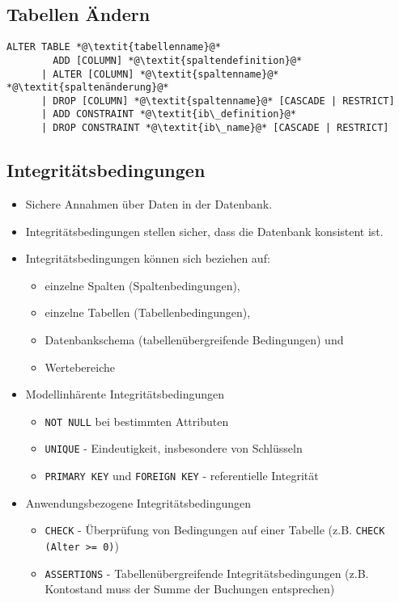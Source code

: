         \subsection{Tabellen Ändern} %
			\begin{lstlisting}
ALTER TABLE *@\textit{tabellenname}@*
		ADD [COLUMN] *@\textit{spaltendefinition}@*
	  | ALTER [COLUMN] *@\textit{spaltenname}@* *@\textit{spaltenänderung}@*
	  | DROP [COLUMN] *@\textit{spaltenname}@* [CASCADE | RESTRICT]
	  | ADD CONSTRAINT *@\textit{ib\_definition}@*
	  | DROP CONSTRAINT *@\textit{ib\_name}@* [CASCADE | RESTRICT]
			\end{lstlisting}

        \subsection{Integritätsbedingungen} %
            \begin{itemize}
            	\item Sichere Annahmen über Daten in der Datenbank.
            	\item Integritätsbedingungen stellen sicher, dass die Datenbank konsistent ist.
            	\item Integritätsbedingungen können sich beziehen auf:
            		\begin{itemize}
            			\item einzelne Spalten (Spaltenbedingungen),
            			\item einzelne Tabellen (Tabellenbedingungen),
            			\item Datenbankschema (tabellenübergreifende Bedingungen) und
            			\item Wertebereiche
            		\end{itemize}
            	\item Modellinhärente Integritätsbedingungen
            		\begin{itemize}
            			\item \lstinline|NOT NULL| bei bestimmten Attributen
            			\item \lstinline|UNIQUE| - Eindeutigkeit, insbesondere von Schlüsseln
            			\item \lstinline|PRIMARY KEY| und \lstinline|FOREIGN KEY| - referentielle Integrität
            		\end{itemize}
            	\item Anwendungsbezogene Integritätsbedingungen
            		\begin{itemize}
            			\item \lstinline|CHECK| - Überprüfung von Bedingungen auf einer Tabelle (z.B. \lstinline|CHECK (Alter >= 0)|)
            			\item \lstinline|ASSERTIONS| - Tabellenübergreifende Integritätsbedingungen (z.B. Kontostand muss der Summe der Buchungen entsprechen)
            		\end{itemize}
            \end{itemize}

